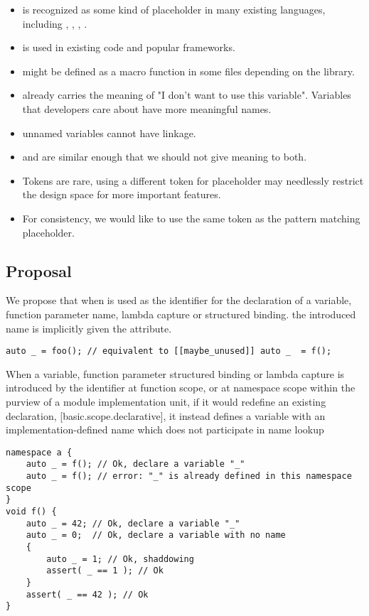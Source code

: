 \documentclass{wg21}
\begin{document}
\begin{itemize}
\item \tcode{_} is recognized as some kind of placeholder in many existing languages, including , , , .
\item \tcode{_} is used in existing code and popular frameworks.
\item \tcode{_} might be defined as a macro function in some files depending on the  library.
\item \tcode{_} already carries the meaning of "I don't want to use this variable". Variables that developers care about have more meaningful names.
\item \tcode{_} unnamed variables cannot have linkage.
\item \tcode{_} and \tcode{__} are similar enough that we should not give meaning to both.
\item Tokens are rare, using a different token for placeholder may needlessly restrict the design space for more important features.
\item For consistency, we would like to use the same token as the pattern matching placeholder.
\end{itemize}

\subsection{Proposal}

We propose that when \tcode{_} is used as the identifier for the declaration of a variable, function parameter name,
lambda capture or structured binding.
the introduced name is implicitly given the  attribute.

\begin{example}
\begin{lstlisting}[style=color]
auto _ = foo(); // equivalent to [[maybe_unused]] auto _  = f();
\end{lstlisting}
\end{example}

When a variable, function parameter structured binding or lambda capture is introduced by the identifier \tcode{_}
at function scope, or at namespace scope within the purview of a module implementation unit,
if it would redefine an existing declaration, [basic.scope.declarative], it instead defines a variable with an implementation-defined name which does not participate in name lookup

\begin{example}
\begin{lstlisting}[style=color]
namespace a {
    auto _ = f(); // Ok, declare a variable "_"
    auto _ = f(); // error: "_" is already defined in this namespace scope
}
void f() {
    auto _ = 42; // Ok, declare a variable "_"
    auto _ = 0;  // Ok, declare a variable with no name
    {
        auto _ = 1; // Ok, shaddowing
        assert( _ == 1 ); // Ok
    }
    assert( _ == 42 ); // Ok
}
\end{lstlisting}
\end{example}
\end{document}

